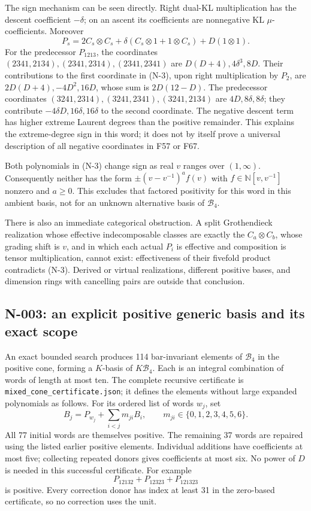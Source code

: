 The sign mechanism can be seen directly.  Right dual-KL multiplication
has the descent coefficient $-\delta$; on an ascent its coefficients
are nonnegative KL $\mu$-coefficients.  Moreover
\[
 P_s=2C_s\otimes C_s+
       \delta(C_s\otimes1+1\otimes C_s)+D(1\otimes1).
 \tag{N-4}
\]
For the predecessor $P_{1213}$, the coordinates
$(2341,2134),(2341,2314),(2341,2341)$ are
$D(D+4),4\delta^3,8D$.  Their contributions to the first coordinate in
(N-3), upon right multiplication by $P_2$, are
$2D(D+4),-4D^2,16D$, whose sum is $2D(12-D)$.
The predecessor coordinates
$(3241,2314),(3241,2341),(3241,2134)$ are
$4D,8\delta,8\delta$; they contribute
$-4\delta D,16\delta,16\delta$ to the second coordinate.
The negative descent term has higher extreme Laurent degrees than the
positive remainder.  This explains the extreme-degree sign in this
word; it does not by itself prove a universal description of all
negative coordinates in F57 or F67.

Both polynomials in (N-3) change sign as real $v$ ranges over $(1,\infty)$.
Consequently neither has the form
$\pm(v-v^{-1})^a f(v)$ with $f\in\mathbb N[v,v^{-1}]$ nonzero and
$a\ge0$.  This excludes that factored positivity for this word in this
ambient basis, not for an unknown alternative basis of $\mathcal B_4$.

There is also an immediate categorical obstruction.  A split
Grothendieck realization whose effective indecomposable classes are
exactly the $C_a\otimes C_b$, whose grading shift is $v$, and in which
each actual $P_i$ is effective and composition is tensor multiplication,
cannot exist: effectiveness of their fivefold product contradicts
(N-3).  Derived or virtual realizations, different positive bases, and
dimension rings with cancelling pairs are outside that conclusion.

\subsection{N-003: an explicit positive generic basis and its exact scope}

An exact bounded search produces 114 bar-invariant elements of
$\mathcal B_4$ in the positive cone, forming a $K$-basis of
$K\mathcal B_4$.  Each is an integral combination of words of length
at most ten.  The complete recursive certificate is
\nolinkurl{mixed_cone_certificate.json}; it defines the elements without
large expanded polynomials as follows.  For its ordered list of words
$w_j$, set
\[
 B_j=P_{w_j}+\sum_{i<j}m_{ji}B_i,
 \qquad m_{ji}\in\{0,1,2,3,4,5,6\}.
 \tag{N-5}
\]
All 77 initial words are themselves positive.  The remaining 37 words
are repaired using the listed earlier positive elements. Individual additions have coefficients at most five; collecting repeated donors gives coefficients at most six. No power of
$D$ is needed in this successful certificate.  For example
\[
                    P_{12132}+P_{12323}+P_{121323}
\]
is positive.  Every correction donor has index at least 31 in the
zero-based certificate, so no correction uses the unit.

